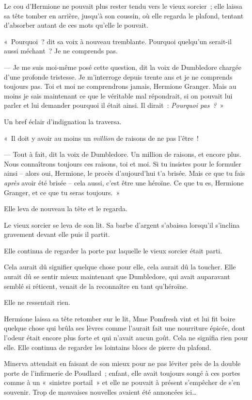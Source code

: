 Le cou d'Hermione ne pouvait plus rester tendu vers le vieux sorcier~; elle laissa sa tête tomber en arrière, jusqu'à son coussin, où elle regarda le plafond, tentant d'absorber autant de ces mots qu'elle le pouvait.

«~Pourquoi~? dit sa voix à nouveau tremblante. Pourquoi quelqu'un serait-il aussi méchant~? Je ne comprends pas.

--- Je me suis moi-même posé cette question, dit la voix de Dumbledore chargée d'une profonde tristesse. Je m'interroge depuis trente ans et je ne comprends toujours pas. Toi et moi ne comprendrons jamais, Hermione Granger. Mais au moins je sais maintenant ce que le véritable mal répondrait, si on pouvait lui parler et lui demander pourquoi il était ainsi. Il dirait~: \emph{Pourquoi pas~?}~»

Un bref éclair d'indignation la traversa.

«~Il doit y avoir au moins un \emph{million} de raisons de ne pas l'être~!

--- Tout à fait, dit la voix de Dumbledore. Un million de raisons, et encore plus. Nous connaîtrons toujours ces raisons, toi et moi. Si tu insistes pour le formuler ainsi -- alors oui, Hermione, le procès d'aujourd'hui t'a brisée. Mais ce que tu fais \emph{après} avoir été brisée -- cela aussi, c'est être une héroïne. Ce que tu es, Hermione Granger, et ce que tu seras toujours.~»

Elle leva de nouveau la tête et le regarda.

Le vieux sorcier se leva de son lit. Sa barbe d'argent s'abaissa lorsqu'il s'inclina gravement devant elle puis il partit.

Elle continua de regarder la porte par laquelle le vieux sorcier était parti.

Cela aurait dû signifier quelque chose pour elle, cela aurait dû la toucher. Elle aurait dû se sentir mieux maintenant que Dumbledore, qui avait auparavant semblé si réticent, venait de la reconnaître en tant qu'héroïne.

Elle ne ressentait rien.

Hermione laissa sa tête retomber sur le lit, Mme Pomfresh vint et lui fit boire quelque chose qui brûla ses lèvres comme l'aurait fait une nourriture épicée, dont l'odeur était encore plus forte et qui n'avait aucun goût. Cela ne signifia rien pour elle. Elle continua de regarder les lointains blocs de pierre du plafond.

\later

Minerva attendait en faisant de son mieux pour ne pas léviter près de la double porte de l'infirmerie de Poudlard~; enfant, elle avait toujours songé à ces portes comme à un «~sinistre portail~» et elle ne pouvait à présent s'empêcher de s'en souvenir. Trop de mauvaises nouvelles avaient été annoncées ici…

